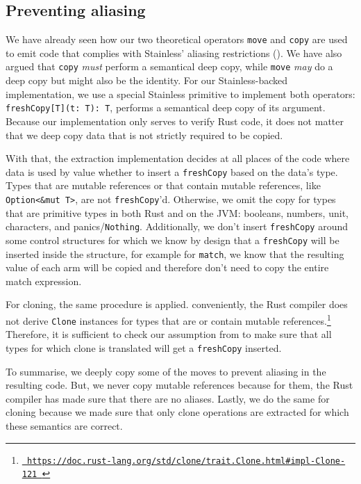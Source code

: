 \subsection{Preventing aliasing}

We have already seen how our two theoretical operators \lstinline!move! and
\lstinline!copy! are used to emit code that complies with Stainless' aliasing
restrictions (). We have also argued that
\lstinline!copy! \emph{must} perform a semantical deep copy, while
\lstinline!move! \emph{may} do a deep copy but might also be the identity. For
our Stainless-backed implementation, we use a special Stainless primitive to
implement both operators: \lstinline!freshCopy[T](t: T): T!, performs a
semantical deep copy of its argument. Because our implementation only serves to
verify Rust code, it does not matter that we deep copy data that is not strictly
required to be copied.

With that, the extraction implementation decides at all places of the code where
data is used by value whether to insert a \lstinline!freshCopy! based on the
data's type. Types that are mutable references or that contain mutable
references, like \lstinline!Option<&mut T>!, are not \lstinline!freshCopy!'d.
Otherwise, we omit the copy for types that are primitive types in both Rust and
on the JVM: booleans, numbers, unit, characters, and panics/\lstinline!Nothing!.
Additionally, we don't insert \lstinline!freshCopy! around some control
structures for which we know by design that a \lstinline!freshCopy! will be
inserted inside the structure, for example for \lstinline!match!, we know that
the resulting value of each arm will be copied and therefore don't need to copy
the entire match expression.

For cloning, the same procedure is applied. conveniently, the Rust compiler does
not derive \lstinline!Clone! instances for types that are or contain mutable
references.\footnote{\href{}{\texttt{\color{MidnightBlue}
https://doc.rust-lang.org/std/clone/trait.Clone.html\#impl-Clone-121 }}}
Therefore, it is sufficient to check our assumption from
 to make sure that all types for which clone is
translated will get a \lstinline!freshCopy! inserted.

To summarise, we deeply copy some of the moves to prevent aliasing in the
resulting code. But, we never copy mutable references because for them, the Rust
compiler has made sure that there are no aliases. Lastly, we do the same for
cloning because we made sure that only clone operations are extracted for which
these semantics are correct.




